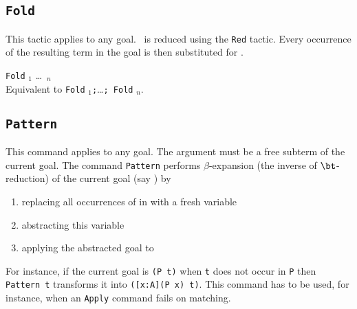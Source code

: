 
\subsection{{\tt Fold} \term}

This tactic applies to any goal. \term\ is reduced using the {\tt Red}
tactic. Every occurrence of the resulting term in the goal is then
substituted for \term.

\begin{Variants}
\item {\tt Fold} \term$_1$ \dots\ \term$_n$ \\
  Equivalent to {\tt Fold} \term$_1${\tt;}\ldots{\tt; Fold} \term$_n$.
\end{Variants}

\subsection{{\tt Pattern {\term}}}
\label{Pattern}
This command applies to any goal. The argument {\term} must be a free
subterm of the current goal.  The command {\tt Pattern} performs
$\beta$-expansion (the inverse of $\bt$-reduction) 
of the current goal (say \T) by
\begin{enumerate}
\item replacing all occurrences of {\term} in {\T} with a fresh variable
\item abstracting this variable
\item applying the abstracted goal to {\term}
\end{enumerate}
For instance, if the current goal {\T} is {\tt (P t)} when {\tt t} does not occur in
{\tt P} then {\tt Pattern t} transforms it into {\tt ([x:A](P x) t)}. This
command has to be used, for instance, when an {\tt Apply} command
fails on matching.

